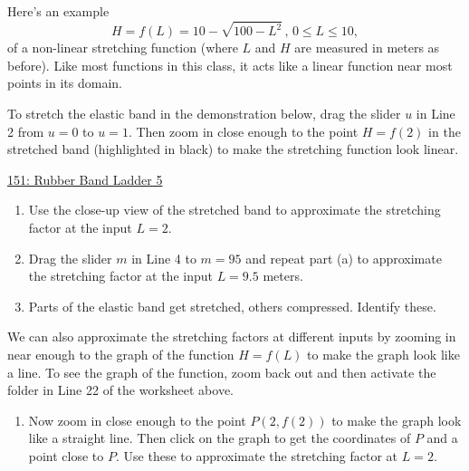 \documentclass{ximera}
\begin{document}
\begin{example} \label{Ex:JDJFHDtet434t}
Here's an example
\[
      H = f(L) = 10 - \sqrt{100-L^2} \, , \, 0\leq L \leq 10,
\] 
of a non-linear stretching function (where $L$ and $H$ are measured in meters as before). Like most functions in this class, it acts like a linear function near most points in its domain. 

To stretch the elastic band in the demonstration below, drag the slider $u$ in Line 2 from $u=0$ to $u=1$. Then zoom in close enough to the point $H=f(2)$ in the stretched band (highlighted in black) to make the stretching function look linear. %


\begin{onlineOnly}
    \begin{center}
\end{center}
\end{onlineOnly}

\href{https://www.desmos.com/calculator/nyd60dbezj}{151: Rubber Band Ladder 5}


\begin{enumerate}

\item Use the close-up view of the stretched band to approximate the stretching factor at the input $L=2$.

\item Drag the slider $m$ in Line 4 to $m=95$ and repeat part (a) to approximate the stretching factor at the input $L=9.5$ meters.

\item Parts of the elastic band get stretched, others compressed. Identify these.
\end{enumerate}

We can also approximate the stretching factors at different inputs by zooming in near enough to the graph of the function $H=f(L)$ to make the graph look like a line. To see the graph of the function, zoom back out and then activate the folder in Line 22 of the worksheet above.

\begin{enumerate}
\item Now zoom in close enough to the point $P(2,f(2))$ to make the graph look like a straight line. Then click on the graph to get the coordinates of $P$ and a point close to $P$. Use these to approximate the stretching factor at $L=2$.


\end{enumerate}
\end{example}
\end{document}
